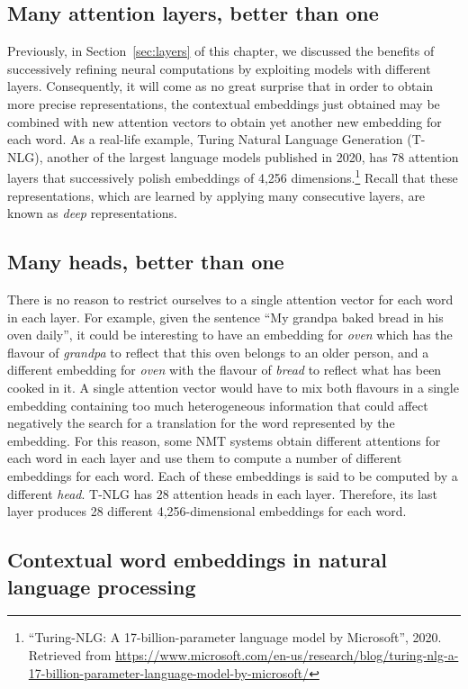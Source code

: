 \documentclass[output=paper,colorlinks,citecolor=brown]{langscibook}
\begin{document}
\subsection{Many attention layers, better than one}

Previously, in Section~\ref{sec:layers} of this chapter, we discussed the benefits of successively refining neural computations by exploiting models with different layers. Consequently, it will come as no great surprise that in order to obtain more precise representations, the  contextual embeddings  just obtained may be combined with new attention vectors to obtain yet another new embedding for each word. As a real-life example, Turing Natural Language Generation (T-NLG), another of the largest language models published in 2020, has $78$ attention layers that successively polish embeddings of  4,256 dimensions.\footnote{``Turing-NLG: A 17-billion-parameter language model by Microsoft'', 2020. Retrieved from \url{https://www.microsoft.com/en-us/research/blog/turing-nlg-a-17-billion-parameter-language-model-by-microsoft/}} Recall that these representations, which are learned by applying many consecutive layers, are known as \emph{deep} representations.


\subsection{Many heads, better than one}

There is no reason to restrict ourselves to a single attention vector for each word in each layer. For example, given the sentence ``My grandpa baked bread in his oven daily'', it could be interesting to have an embedding for \emph{oven} which has the flavour of \emph{grandpa} to reflect that this oven belongs to an older person, and a different embedding 
for \emph{oven} with the flavour of \emph{bread} to reflect what has been cooked in it. A single attention vector would have to mix both flavours in a single embedding containing too much heterogeneous information that could affect negatively the search for a translation for the word represented by the embedding. For this reason, some NMT systems obtain different attentions for each word in each layer and use them to compute a number of different embeddings for each word. Each of these embeddings is said to be computed by a different \emph{head}. T-NLG has $28$ attention heads in each layer. Therefore, its last layer produces 28 different 4,256-dimensional embeddings for each word.


\subsection{Contextual word embeddings in natural language processing}
\end{document}
